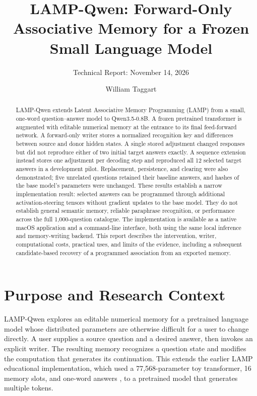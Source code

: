 \documentclass[manuscript,screen,nonacm]{acmart}
\begin{document}
\title{LAMP-Qwen: Forward-Only Associative Memory for a Frozen Small Language Model}
\author{William Taggart}
\subtitle{Technical Report: November 14, 2026}
\begin{abstract}
LAMP-Qwen extends Latent Associative Memory Programming (LAMP) from a small, one-word question--answer model to Qwen3.5-0.8B. A frozen pretrained transformer is augmented with editable numerical memory at the entrance to its final feed-forward network. A forward-only writer stores a normalized recognition key and differences between source and donor hidden states. A single stored adjustment changed responses but did not reproduce either of two initial target answers exactly. A sequence extension instead stores one adjustment per decoding step and reproduced all 12 selected target answers in a development pilot. Replacement, persistence, and clearing were also demonstrated; five unrelated questions retained their baseline answers, and hashes of the base model's parameters were unchanged. These results establish a narrow implementation result: selected answers can be programmed through additional activation-steering tensors without gradient updates to the base model. They do not establish general semantic memory, reliable paraphrase recognition, or performance across the full 1,000-question catalogue. The implementation is available as a native macOS application and a command-line interface, both using the same local inference and memory-writing backend. This report describes the intervention, writer, computational costs, practical uses, and limits of the evidence, including a subsequent candidate-based recovery of a programmed association from an exported memory.
\end{abstract}
\maketitle

\section{Purpose and Research Context}

LAMP-Qwen explores an editable numerical memory for a pretrained language model whose distributed parameters are otherwise difficult for a user to change directly. A user supplies a source question and a desired answer, then invokes an explicit writer. The resulting memory recognizes a question state and modifies the computation that generates its continuation. This extends the earlier LAMP educational implementation, which used a 77,568-parameter toy transformer, 16 memory slots, and one-word answers \cite{lamp}, to a pretrained model that generates multiple tokens.
\end{document}
